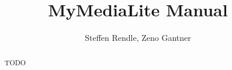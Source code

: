 \documentclass{report}
\title{MyMediaLite Manual}
\author{Steffen Rendle, Zeno Gantner}
\begin{document}
\maketitle

\tableofcontents

\begin{abstract}
TODO
\end{abstract}

\newpage
\end{document}
